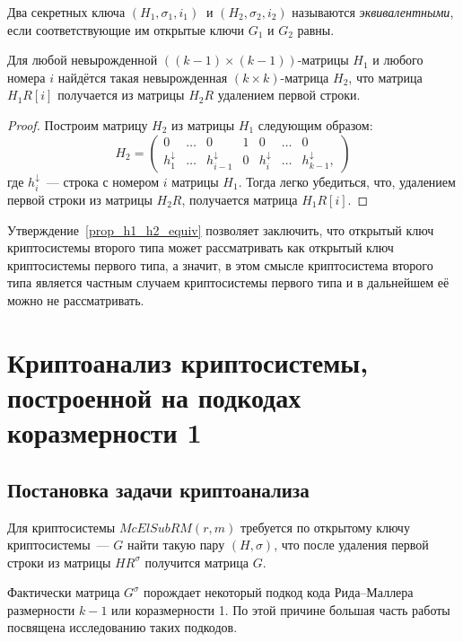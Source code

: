 \begin{definition}
	Два секретных ключа \((H_1,\sigma_1, i_1) \  \) и \((H_2, \sigma_2, i_2 )\) называются \emph{эквивалентными}, если соответствующие им открытые ключи \(G_1\) и \(G_2\) равны.
\end{definition}

\begin{proposition}
	\label{prop_h1_h2_equiv}
	Для любой невырожденной $((k-1)\times(k-1))$-матрицы $H_1$ и любого номера $i$ найдётся такая невырожденная $(k\times k)$-матрица $H_2$, что матрица
	\(H_1R[i]\) получается из матрицы \(H_2R\) удалением первой строки.
\end{proposition}
\begin{proof}
	Построим матрицу $H_2$ из матрицы $H_1$ следующим образом:
	\[
		H_2=\begin{pmatrix}
			0                & \ldots & 0                    & 1 & 0                & \ldots & 0                     \\
			h^{\downarrow}_1 & \ldots & h^{\downarrow}_{i-1} & 0 & h^{\downarrow}_i & \ldots & h^{\downarrow}_{k-1},
		\end{pmatrix}
	\]
	где $h^{\downarrow}_i$~--- строка с номером $i$ матрицы $H_1$.
	Тогда легко убедиться, что, удалением первой строки из матрицы $H_2R$, получается матрица $H_1R[i]$.
\end{proof}
Утверждение~\ref{prop_h1_h2_equiv} позволяет заключить, что открытый ключ криптосистемы второго типа может рассматривать как открытый ключ криптосистемы первого типа, а значит, в этом смысле криптосистема второго типа является частным случаем криптосистемы первого типа и в дальнейшем её можно не рассматривать.

\section{Криптоанализ криптосистемы, построенной на подкодах коразмерности 1}

\subsection{Постановка задачи криптоанализа}

Для криптосистемы \(McElSubRM(r,m)\)  требуется по открытому ключу криптосистемы~--- \(G\)  найти такую пару \((H,\sigma)\), что после удаления первой строки из матрицы \(HR^{\sigma}\) получится матрица \(G.\)

Фактически матрица \(G^{\sigma}\) порождает некоторый подкод кода Рида--Маллера размерности \(k-1\) или коразмерности 1.
По этой причине большая часть работы посвящена исследованию таких подкодов.

